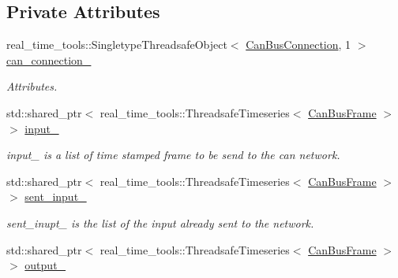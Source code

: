 \subsection*{Private Attributes}
\begin{DoxyCompactItemize}
\item 
real\+\_\+time\+\_\+tools\+::\+Singletype\+Threadsafe\+Object$<$ \hyperlink{classblmc__drivers_1_1CanBusConnection}{Can\+Bus\+Connection}, 1 $>$ \hyperlink{classblmc__drivers_1_1CanBus_a996c9b1bc46071b2d002de38d6e9f781}{can\+\_\+connection\+\_\+}
\begin{DoxyCompactList}\small\item\em Attributes. \end{DoxyCompactList}\item 
std\+::shared\+\_\+ptr$<$ real\+\_\+time\+\_\+tools\+::\+Threadsafe\+Timeseries$<$ \hyperlink{classblmc__drivers_1_1CanBusFrame}{Can\+Bus\+Frame} $>$ $>$ \hyperlink{classblmc__drivers_1_1CanBus_ab09707f2c5f6cb7eb98f82e8e190d3c4}{input\+\_\+}\hypertarget{classblmc__drivers_1_1CanBus_ab09707f2c5f6cb7eb98f82e8e190d3c4}{}\label{classblmc__drivers_1_1CanBus_ab09707f2c5f6cb7eb98f82e8e190d3c4}

\begin{DoxyCompactList}\small\item\em input\+\_\+ is a list of time stamped frame to be send to the can network. \end{DoxyCompactList}\item 
std\+::shared\+\_\+ptr$<$ real\+\_\+time\+\_\+tools\+::\+Threadsafe\+Timeseries$<$ \hyperlink{classblmc__drivers_1_1CanBusFrame}{Can\+Bus\+Frame} $>$ $>$ \hyperlink{classblmc__drivers_1_1CanBus_ae1ecf491b819c83eb999bb9cdde6fb21}{sent\+\_\+input\+\_\+}\hypertarget{classblmc__drivers_1_1CanBus_ae1ecf491b819c83eb999bb9cdde6fb21}{}\label{classblmc__drivers_1_1CanBus_ae1ecf491b819c83eb999bb9cdde6fb21}

\begin{DoxyCompactList}\small\item\em sent\+\_\+inupt\+\_\+ is the list of the input already sent to the network. \end{DoxyCompactList}\item 
std\+::shared\+\_\+ptr$<$ real\+\_\+time\+\_\+tools\+::\+Threadsafe\+Timeseries$<$ \hyperlink{classblmc__drivers_1_1CanBusFrame}{Can\+Bus\+Frame} $>$ $>$ \hyperlink{classblmc__drivers_1_1CanBus_ad9802d502698f202f9842a0c00372931}{output\+\_\+}\hypertarget{classblmc__drivers_1_1CanBus_ad9802d502698f202f9842a0c00372931}{}\label{classblmc__drivers_1_1CanBus_ad9802d502698f202f9842a0c00372931}


\end{DoxyCompactItemize}
